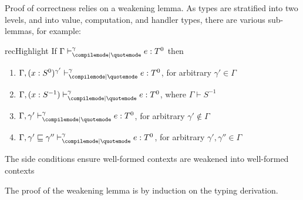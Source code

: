 Proof of correctness relies on a weakening lemma. As types are stratified into two levels, and into value, computation, and handler types, there are various sub-lemmas, for example:

\newcommand{\rcqtypejudge}[4][\Gamma]{{#1} \vdash_{\compilemode \mid \quotemode}^{#2} {#3} : {#4}}
\newcommand{\rctypejudge}[4][\Gamma]{{#1} \vdash_{\compilemode}^{#2} {#3} : {#4}}
\newcommand{\rqtypejudge}[4][\Gamma]{{#1} \vdash_{\quotemode}^{#2} {#3}: {#4}}
\newcommand{\rstypejudge}[3][\Gamma]{{#1} \vdash_{\splicemode} {#2} : {#3}}

\begin{lemma}{recHighlight}
  If $\rcqtypejudge{\gamma}{e}{T^0}$ then
  \begin{enumerate}
    \item $\rcqtypejudge[\Gamma, (x:S^0)^{\gamma'}]{\gamma}{e}{T^0}$, for arbitrary $\gamma' \in \Gamma$
    \item $\rcqtypejudge[\Gamma, (x:S^{-1})]{\gamma}{e}{T^0}$, where $\Gamma \vdash S^{-1}$
    \item $\rcqtypejudge[\Gamma, \gamma']{\gamma}{e}{T^0}$, for arbitrary $\gamma' \notin \Gamma$
    \item $\rcqtypejudge[\Gamma, \gamma' \sqsubseteq \gamma'']{\gamma}{e}{T^0}$, for arbitrary $\gamma', \gamma'' \in \Gamma$
  \end{enumerate}
  The side conditions ensure well-formed contexts are weakened into well-formed contexts
\end{lemma}
The proof of the weakening lemma is by induction on the typing derivation.

